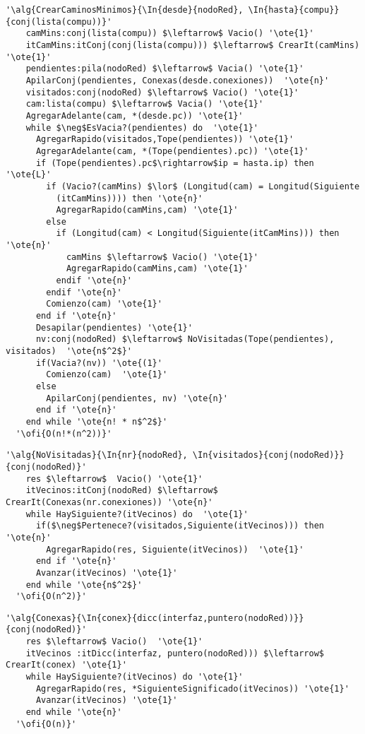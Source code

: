 \begin{lstlisting}[mathescape]
  '\alg{CrearCaminosMinimos}{\In{desde}{nodoRed}, \In{hasta}{compu}}{conj(lista(compu))}'
    camMins:conj(lista(compu)) $\leftarrow$ Vacio() '\ote{1}'
    itCamMins:itConj(conj(lista(compu))) $\leftarrow$ CrearIt(camMins) '\ote{1}'
    pendientes:pila(nodoRed) $\leftarrow$ Vacia() '\ote{1}'
    ApilarConj(pendientes, Conexas(desde.conexiones))  '\ote{n}'
    visitados:conj(nodoRed) $\leftarrow$ Vacio() '\ote{1}'
    cam:lista(compu) $\leftarrow$ Vacia() '\ote{1}'
    AgregarAdelante(cam, *(desde.pc)) '\ote{1}'
    while $\neg$EsVacia?(pendientes) do  '\ote{1}'
      AgregarRapido(visitados,Tope(pendientes)) '\ote{1}'
      AgregarAdelante(cam, *(Tope(pendientes).pc)) '\ote{1}'
      if (Tope(pendientes).pc$\rightarrow$ip = hasta.ip) then '\ote{L}'
        if (Vacio?(camMins) $\lor$ (Longitud(cam) = Longitud(Siguiente
          (itCamMins)))) then '\ote{n}'
          AgregarRapido(camMins,cam) '\ote{1}'
        else
          if (Longitud(cam) < Longitud(Siguiente(itCamMins))) then '\ote{n}'
            camMins $\leftarrow$ Vacio() '\ote{1}'
            AgregarRapido(camMins,cam) '\ote{1}'
          endif '\ote{n}'
        endif '\ote{n}'
        Comienzo(cam) '\ote{1}'
      end if '\ote{n}'
      Desapilar(pendientes) '\ote{1}'
      nv:conj(nodoRed) $\leftarrow$ NoVisitadas(Tope(pendientes), visitados)  '\ote{n$^2$}'
      if(Vacia?(nv)) '\ote{(1}'
        Comienzo(cam)  '\ote{1}'
      else
        ApilarConj(pendientes, nv) '\ote{n}'
      end if '\ote{n}'
    end while '\ote{n! * n$^2$}'
  '\ofi{O(n!*(n^2))}'
\end{lstlisting}


\begin{lstlisting}[mathescape]
  '\alg{NoVisitadas}{\In{nr}{nodoRed}, \In{visitados}{conj(nodoRed)}}{conj(nodoRed)}'
    res $\leftarrow$  Vacio() '\ote{1}'
    itVecinos:itConj(nodoRed) $\leftarrow$ CrearIt(Conexas(nr.conexiones)) '\ote{n}'
    while HaySiguiente?(itVecinos) do  '\ote{1}'                                                   
      if($\neg$Pertenece?(visitados,Siguiente(itVecinos))) then '\ote{n}'
        AgregarRapido(res, Siguiente(itVecinos))  '\ote{1}'
      end if '\ote{n}'
      Avanzar(itVecinos) '\ote{1}'
    end while '\ote{n$^2$}'
  '\ofi{O(n^2)}'
\end{lstlisting}

\begin{lstlisting}[mathescape]
  '\alg{Conexas}{\In{conex}{dicc(interfaz,puntero(nodoRed))}}{conj(nodoRed)}'
    res $\leftarrow$ Vacio()  '\ote{1}'
    itVecinos :itDicc(interfaz, puntero(nodoRed))) $\leftarrow$ CrearIt(conex) '\ote{1}'
    while HaySiguiente?(itVecinos) do '\ote{1}'                                                    
      AgregarRapido(res, *SiguienteSignificado(itVecinos)) '\ote{1}'
      Avanzar(itVecinos) '\ote{1}'
    end while '\ote{n}'
  '\ofi{O(n)}'
\end{lstlisting}


